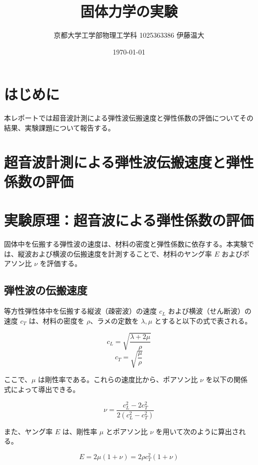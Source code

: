 \documentclass[uplatex,dvipdfmx,titlepage]{jsarticle}
\title{固体力学の実験}
\author{京都大学工学部物理工学科 1025363386 伊藤温大}
\date{\today}
\begin{document}
\maketitle
\section{はじめに}
本レポートでは超音波計測による弾性波伝搬速度と弾性係数の評価についてその結果、実験課題について報告する。

\section{超音波計測による弾性波伝搬速度と弾性係数の評価}
\section{実験原理：超音波による弾性係数の評価}

固体中を伝搬する弾性波の速度は、材料の密度と弾性係数に依存する。本実験では、縦波および横波の伝搬速度を計測することで、材料のヤング率 $E$ およびポアソン比 $\nu$ を評価する。

\subsection{弾性波の伝搬速度}
等方性弾性体中を伝搬する縦波（疎密波）の速度 $c_L$ および横波（せん断波）の速度 $c_T$ は、材料の密度を $\rho$、ラメの定数を $\lambda, \mu$ とすると以下の式で表される。

\begin{equation}
    c_L = \sqrt{\frac{\lambda + 2\mu}{\rho}}
\end{equation}
\begin{equation}
    c_T = \sqrt{\frac{\mu}{\rho}}
\end{equation}

ここで、$\mu$ は剛性率である。これらの速度比から、ポアソン比 $\nu$ を以下の関係式によって導出できる。

\begin{equation}
    \nu = \frac{c_L^2 - 2c_T^2}{2(c_L^2 - c_T^2)}
\end{equation}

また、ヤング率 $E$ は、剛性率 $\mu$ とポアソン比 $\nu$ を用いて次のように算出される。

\begin{equation}
    E = 2\mu(1 + \nu) = 2\rho c_T^2(1 + \nu)
\end{equation}
\end{document}
